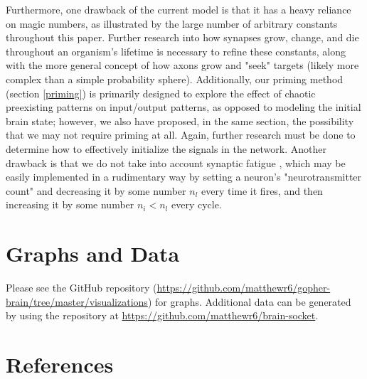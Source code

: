 \documentclass[12pt]{article}
\begin{document}
Furthermore, one drawback of the current model is that it has a heavy reliance on magic numbers, as illustrated by the large number of arbitrary constants throughout this paper.  Further research into how synapses grow, change, and die throughout an organism's lifetime is necessary to refine these constants, along with the more general concept of how axons grow and "seek" targets (likely more complex than a simple probability sphere).  Additionally, our priming method (section \ref{priming}) is primarily designed to explore the effect of chaotic preexisting patterns on input/output patterns, as opposed to modeling the initial brain state; however, we also have proposed, in the same section, the possibility that we may not require priming at all.  Again, further research must be done to determine how to effectively initialize the signals in the network.  Another drawback is that we do not take into account synaptic fatigue \cite{synapticfatigue}, which may be easily implemented in a rudimentary way by setting a neuron's "neurotransmitter count" and decreasing it by some number $n_l$ every time it fires, and then increasing it by some number $n_i < n_l$ every cycle.


\newpage

\section{Graphs and Data} \label{graphs}

Please see the GitHub repository (\url{https://github.com/matthewr6/gopher-brain/tree/master/visualizations}) for graphs.  Additional data can be generated by using the repository at \url{https://github.com/matthewr6/brain-socket}.


\newpage

\section{References}

\printbibliography[heading=none]
\end{document}
